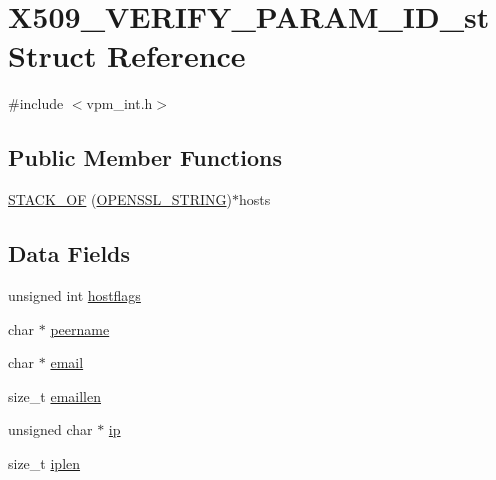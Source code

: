 \hypertarget{struct_x509___v_e_r_i_f_y___p_a_r_a_m___i_d__st}{}\section{X509\+\_\+\+V\+E\+R\+I\+F\+Y\+\_\+\+P\+A\+R\+A\+M\+\_\+\+I\+D\+\_\+st Struct Reference}
\label{struct_x509___v_e_r_i_f_y___p_a_r_a_m___i_d__st}


{\ttfamily \#include $<$vpm\+\_\+int.\+h$>$}

\subsection*{Public Member Functions}
\begin{DoxyCompactItemize}
\item 
\hyperlink{struct_x509___v_e_r_i_f_y___p_a_r_a_m___i_d__st_a897a80adf12b95f0c75dfca6ad547cec}{S\+T\+A\+C\+K\+\_\+\+OF} (\hyperlink{crypto_2stack_2safestack_8h_a0c7cad03962a61035f753d64e05503e3}{O\+P\+E\+N\+S\+S\+L\+\_\+\+S\+T\+R\+I\+NG})$\ast$hosts
\end{DoxyCompactItemize}
\subsection*{Data Fields}
\begin{DoxyCompactItemize}
\item 
unsigned int \hyperlink{struct_x509___v_e_r_i_f_y___p_a_r_a_m___i_d__st_ae254ee48cb3221864a378aca5b052d29}{hostflags}
\item 
char $\ast$ \hyperlink{struct_x509___v_e_r_i_f_y___p_a_r_a_m___i_d__st_a7c727915fde755a627627ea1bb5441f7}{peername}
\item 
char $\ast$ \hyperlink{struct_x509___v_e_r_i_f_y___p_a_r_a_m___i_d__st_a463fc22ce8b197bd60dbcdcbba158f4b}{email}
\item 
size\+\_\+t \hyperlink{struct_x509___v_e_r_i_f_y___p_a_r_a_m___i_d__st_a14da9b82f3b86e3038b7ed909f89c2a4}{emaillen}
\item 
unsigned char $\ast$ \hyperlink{struct_x509___v_e_r_i_f_y___p_a_r_a_m___i_d__st_a82531b0256395947cfb0eab985117caa}{ip}
\item 
size\+\_\+t \hyperlink{struct_x509___v_e_r_i_f_y___p_a_r_a_m___i_d__st_a1b44021adced96d2d8dea43f3aa99c5d}{iplen}
\end{DoxyCompactItemize}



